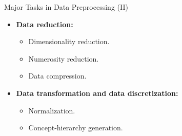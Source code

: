 \begin{frame}{Major Tasks in Data Preprocessing (II)}
	\begin{itemize}
		\item \textbf{Data reduction:}
		      \begin{itemize}
			      \item Dimensionality reduction.
			      \item Numerosity reduction.
			      \item Data compression.
		      \end{itemize}
		\item \textbf{Data transformation and data discretization:}
		      \begin{itemize}
			      \item Normalization.
			      \item Concept-hierarchy generation.
		      \end{itemize}
	\end{itemize}
\end{frame}
